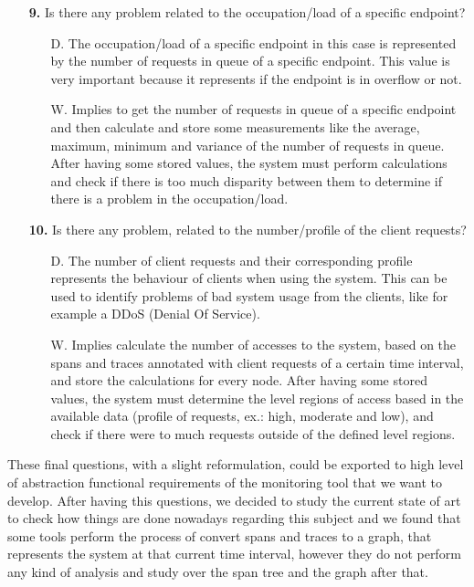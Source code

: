 \begin{enumerate}
\begin{itemize}
    \item[\textbf{9.}] Is there any problem related to the occupation/load of a specific endpoint?
    \begin{itemize}
        \item[D.] The occupation/load of a specific endpoint in this case is represented by the number of requests in queue of a specific endpoint. This value is very important because it represents if the endpoint is in overflow or not.
        \item[W.] Implies to get the number of requests in queue of a specific endpoint and then calculate and store some measurements like the average, maximum, minimum and variance of the number of requests in queue. After having some stored values, the system must perform calculations and check if there is too much disparity between them to determine if there is a problem in the occupation/load.
    \end{itemize}

    \item[\textbf{10.}] Is there any problem, related to the number/profile of the client requests?
    \begin{itemize}
        \item[D.] The number of client requests and their corresponding profile represents the behaviour of clients when using the system. This can be used to identify problems of bad system usage from the clients, like for example a DDoS (Denial Of Service).
        \item[W.] Implies calculate the number of accesses to the system, based on the spans and traces annotated with client requests of a certain time interval, and store the calculations for every node. After having some stored values, the system must determine the level regions of access based in the available data (profile of requests, ex.: high, moderate and low), and check if there were to much requests outside of the defined level regions.
    \end{itemize}
\end{itemize}

 These final questions, with a slight reformulation, could be exported to high level of abstraction functional requirements of the monitoring tool that we want to develop. After having this questions, we decided to study the current state of art to check how things are done nowadays regarding this subject and we found that some tools perform the process of convert spans and traces to a graph, that represents the system at that current time interval, however they do not perform any kind of analysis and study over the span tree and the graph after that\cite{spans_analysis}.
 

\end{enumerate}
